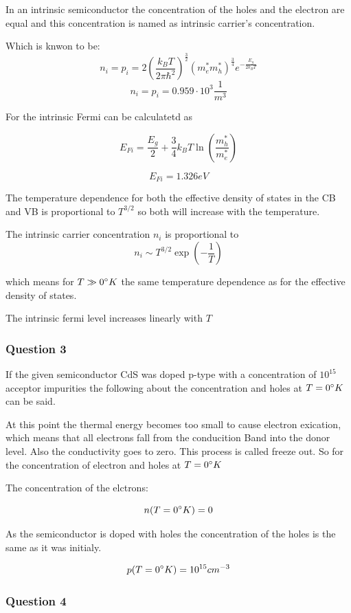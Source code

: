 In an intrinsic semiconductor the concentration of the holes and the 
electron are equal and this concentration is named as
intrinsic carrier's concentration. 

Which is knwon to be:
$$n_i = p_i = 2 \left( \frac{k_BT}{2\pi\hbar^2} \right)^{\frac{3}{2}}
  (m_e^*m_h^*)^{\frac{3}{4}} e^{-\frac{E_g}{2k_BT}}$$
$$n_i = p_i = 0.959 \cdot 10^3 \frac{1}{m^3}$$

For the intrinsic Fermi can be calculatetd as 

$$E_{Fi} = \frac{E_g}{2} + \frac{3}{4} k_B T \ln\left( \frac{m_h^*}{m_e^*} \right)$$

$$E_{Fi} = 1.326 eV$$

The temperature dependence for both the effective density
of states in the CB and VB is proportional to $T^{3/2}$ so
both will increase with the temperature.

The intrinsic carrier concentration $n_i$ is proportional to
$$n_i \sim T^{3/2} \exp(-\frac{1}{T})$$

which means for $T \gg 0 \degree K$ the same temperature dependence as for the effective density of states.

The intrinsic fermi level increases linearly with $T$


\subsubsection*{Question 3}

If the given semiconductor CdS was doped p-type with a
concentration of $10^{15}$ acceptor impurities the following
about the concentration and holes at $T=0\degree K$ can be said.

At this point the thermal energy becomes too small to cause electron exication, which means that all electrons fall from
the conducition Band into the donor level. Also the conductivity
goes to zero. This process is called freeze out. 
So for the concentration of electron and holes at $T=0 \degree K$

The concentration of the elctrons:

$$n(T=0 \degree K) = 0$$

As the semiconductor is doped with holes the concentration of the
holes is the same as it was initialy.

$$p(T=0 \degree K) = 10^{15}cm^{-3}$$


\subsubsection*{Question 4}

